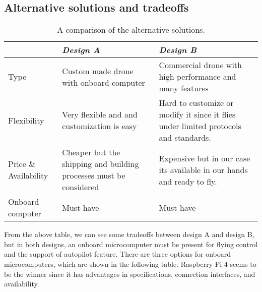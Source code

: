 \documentclass[../main.tex]{subfiles}
\begin{document}
\subsection{Alternative solutions and tradeoffs}
\begin{table}[H]
    \centering
    \caption{A comparison of the alternative solutions.}
    \label{tab:alt-solutions}
    \begin{tabular}{ p{4cm} p{6cm} p{6cm} }
        \toprule
        \textit{} & \textit{Design A} & \textit{Design B}\\ \midrule
        Type  & Custom made drone with onboard computer & Commercial drone with high performance and many features    \\
        Flexibility & Very flexible and and customization is easy & Hard to customize or modify it since it flies under limited protocols and standards. \\

        Price \& Availability & Cheaper but the shipping and building processes must be considered & Expensive but in our case its available in our hands and ready to fly.   \\

        Onboard computer & Must have & Must have \\
        \bottomrule
    \end{tabular}
\end{table} 
From the above table, we can see some tradeoffs between design A and design B, but in both designs, an onboard microcomputer must be present for flying control and the support of autopilot feature. There are three options for onboard microcomputers, which are shown in the following table. Raspberry Pi 4 seems to be the winner since it has advantages in specifications, connection interfaces, and availability.
\end{document}
